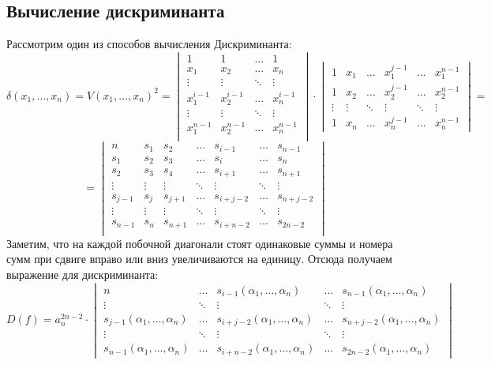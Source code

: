 \documentclass[12pt]{article}
\theoremstyle{definition}
\begin{document}
\subsection*{Вычисление дискриминанта}
Рассмотрим один из способов вычисления Дискриминанта: 
$$
	\delta(x_1,\dotsc,x_n) = V(x_1,\dotsc,x_n)^2 = 
	\begin{vmatrix}
		1 & 1 &  \dotsc & 1\\
		x_1 & x_2 & \dotsc & x_n\\
		\vdots & \vdots & \ddots& \vdots \\
		x_1^{i-1} & x_2^{i-1} & \dotsc & x_n^{i-1}\\
		\vdots & \vdots & \ddots& \vdots \\
		x_1^{n-1} & x_2^{n-1} & \dotsc & x_n^{n-1}\\
	\end{vmatrix}{\cdot}
	\begin{vmatrix}
		1 & x_1 & \dotsc & x_1^{j-1 } & \dotsc & x_1^{n-1}\\
		1 & x_2 & \dotsc & x_2^{j-1 } & \dotsc & x_2^{n-1}\\
		\vdots & \vdots & \ddots & \vdots & \ddots & \vdots \\
		1 & x_n & \dotsc & x_n^{j-1 } & \dotsc & x_n^{n-1}
	\end{vmatrix} =
$$
$$
	=	
	\begin{vmatrix}
		n & s_1 & s_2 & \dotsc & s_{i-1} & \dotsc  & s_{n-1} \\
		s_1 & s_2 & s_3& \dotsc & s_{i} & \dotsc & s_n \\
		s_2 & s_3 & s_4 & \dotsc & s_{i+1} & \dotsc & s_{n+1}\\
		\vdots & \vdots & \vdots & \ddots & \vdots & \ddots & \vdots\\
		s_{j-1} & s_{j} & s_{j + 1} & \dotsc & s_{i+j - 2} & \dotsc & s_{n+j - 2}\\
		\vdots & \vdots & \vdots & \ddots & \vdots & \ddots & \vdots\\
		s_{n-1} & s_{n} & s_{n + 1} & \dotsc & s_{i+n - 2} & \dotsc & s_{2n - 2}\\
	\end{vmatrix}
$$
Заметим, что на каждой побочной диагонали стоят одинаковые суммы и номера сумм при сдвиге вправо или вниз увеличиваются на единицу. Отсюда получаем выражение для дискриминанта:
$$
	D(f) = a_n^{2n-2}{\cdot}
	\begin{vmatrix}
		n &  \dotsc & s_{i-1}(\alpha_1,\dotsc,\alpha_n) & \dotsc  & s_{n-1}(\alpha_1,\dotsc,\alpha_n) \\
		\vdots &  \ddots & \vdots & \ddots & \vdots\\
		s_{j-1}(\alpha_1,\dotsc,\alpha_n) &  \dotsc & s_{i+j - 2}(\alpha_1,\dotsc,\alpha_n) & \dotsc & s_{n+j - 2}(\alpha_1,\dotsc,\alpha_n)\\
		\vdots &  \ddots & \vdots & \ddots & \vdots\\
		s_{n-1}(\alpha_1,\dotsc,\alpha_n) &  \dotsc & s_{i+n - 2}(\alpha_1,\dotsc,\alpha_n) & \dotsc & s_{2n - 2}(\alpha_1,\dotsc,\alpha_n)
	\end{vmatrix}
$$
\end{document}

